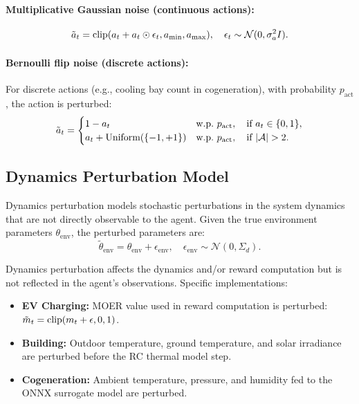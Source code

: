 \paragraph{Multiplicative Gaussian noise (continuous actions):}
\begin{equation}
    \tilde{a}_t = \operatorname{clip}(a_t + a_t \odot \epsilon_t, a_{\min}, a_{\max}), \quad \epsilon_t \sim \mathcal{N}(0, \sigma_a^2 I).
\end{equation}

\paragraph{Bernoulli flip noise (discrete actions):} For discrete actions (e.g., cooling bay count in cogeneration), with probability $p_{\text{act}}$, the action is perturbed:
\begin{equation}
    \tilde{a}_t = \begin{cases}
    1 - a_t & \text{w.p.\ } p_{\text{act}}, \quad \text{if } a_t \in \{0, 1\}, \\
    a_t + \text{Uniform}(\{-1, +1\}) & \text{w.p.\ } p_{\text{act}}, \quad \text{if } |\mathcal{A}| > 2.
    \end{cases}
\end{equation}

\subsection{Dynamics Perturbation Model}

Dynamics perturbation models stochastic perturbations in the system dynamics that are not directly observable to the agent. Given the true environment parameters $\theta_{\text{env}}$, the perturbed parameters are:
\begin{equation}
    \tilde{\theta}_{\text{env}} = \theta_{\text{env}} + \epsilon_{\text{env}}, \quad \epsilon_{\text{env}} \sim \mathcal{N}(0, \Sigma_d).
    \label{eq:env_noise}
\end{equation}

Dynamics perturbation affects the dynamics and/or reward computation but is not reflected in the agent's observations. Specific implementations:
\begin{itemize}
    \item \textbf{EV Charging:} MOER value used in reward computation is perturbed: $\tilde{m}_t = \operatorname{clip}(m_t + \epsilon, 0, 1)$.
    \item \textbf{Building:} Outdoor temperature, ground temperature, and solar irradiance are perturbed before the RC thermal model step.
    \item \textbf{Cogeneration:} Ambient temperature, pressure, and humidity fed to the ONNX surrogate model are perturbed.
\end{itemize}

